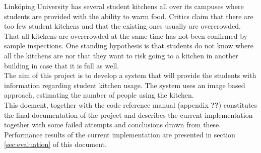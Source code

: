 Linköping University has several student kitchens all over its campuses where students are provided with the ability to warm food. Critics claim that there are too few student kitchens and that the existing ones usually are overcrowded. That all kitchens are overcrowded at the same time has not been confirmed by sample inspections. One standing hypothesis is that students do not know where all the kitchens are nor that they want to risk going to a kitchen in another building in case that it is full as well.\\

The aim of this project is to develop a system that will provide the students with information regarding student kitchen usage. The system uses an image based approach, estimating the number of people using the kitchen.\\

This docment, together with the code reference manual (appendix \textbf{??}) constitutes the final documentation of the project and describes the current implementation together with some failed attempts and conclusions drawn from these. Performance results of the current implementation are presented in section \ref{sec:evaluation} of this document.